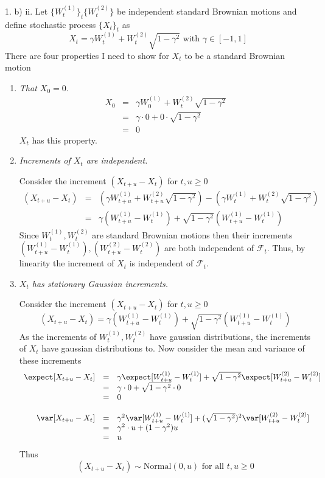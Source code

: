 \documentclass[11pt,a4paper]{article}
\begin{document}
\begin{answer}{1. b) ii.}
  Let $\{W_t^{(1)}\}_t\{W_t^{(2)}\}$ be independent standard Brownian motions and define stochastic process $\{X_t\}_t$ as
  \[ X_t=\gamma W_t^{(1)}+W_t^{(2)}\sqrt{1-\gamma^2}\text{ with }\gamma\in[-1,1] \]
  There are four properties I need to show for $X_t$ to be a standard Brownian motion
  \begin{enumerate}
    \item \textit{That $X_0=0$.}
    \[\begin{array}{rcl}
      X_0&=&\gamma W_0^{(1)}+W_t^{(2)}\sqrt{1-\gamma^2}\\
      &=&\gamma\cdot0+0\cdot\sqrt{1-\gamma^2}\\
      &=&0
    \end{array}\]
    $X_t$ has this property.

    \item \textit{Increments of $X_t$ are independent.}
    \par Consider the increment $(X_{t+u}-X_t)$ for $t,u\geq0$
    \[\begin{array}{rcl}
      (X_{t+u}-X_t)&=&\left(\gamma W_{t+u}^{(1)}+W_{t+u}^{(2)}\sqrt{1-\gamma^2}\right)-\left(\gamma W_{t}^{(1)}+W_{t}^{(2)}\sqrt{1-\gamma^2}\right)\\
      &=&\gamma(W_{t+u}^{(1)}-W_t^{(1)})+\sqrt{1-\gamma^2}(W_{t+u}^{(1)}-W_t^{(1)})
    \end{array}\]
    Since $W_t^{(1)},W_t^{(2)}$ are standard Brownian motions then their increments $(W_{t+u}^{(1)}-W_t^{(1)}),(W_{t+u}^{(2)}-W_t^{(2)})$ are both independent of $\mathcal{F}_t$. Thus, by linearity the increment of $X_t$ is independent of $\mathcal{F}_t$.

    \item \textit{$X_t$ has stationary Gaussian increments.}
    \par Consider the increment $(X_{t+u}-X_t)$ for $t,u\geq0$
    \[ (X_{t+u}-X_t)=\gamma(W_{t+u}^{(1)}-W_t^{(1)})+\sqrt{1-\gamma^2}(W_{t+u}^{(1)}-W_t^{(1)}) \]
    As the increments of $W_t^{(1)},W_t^{(2)}$ have gaussian distributions, the increments of $X_t$ have gaussian distributions to. Now consider the mean and variance of these increments
    \[\begin{array}{rcl}
      \expect[X_{t+u}-X_t]&=&\gamma\expect[W_{t+u}^{(1)}-W_t^{(1)}]+\sqrt{1-\gamma^2}\expect[W_{t+u}^{(2)}-W_t^{(2)}]\\
      &=&\gamma\cdot0+\sqrt{1-\gamma^2}\cdot0\\
      &=&0\\\\
      \var[X_{t+u}-X_t]&=&\gamma^2\var[W_{t+u}^{(1)}-W_t^{(1)}]+(\sqrt{1-\gamma^2})^2\var[W_{t+u}^{(2)}-W_t^{(2)}]\\
      &=&\gamma^2\cdot u+(1-\gamma^2)u\\
      &=&u
    \end{array}\]
    Thus
    \[ (X_{t+u}-X_t)\sim\text{Normal}(0,u)\text{ for all }t,u\geq0 \]


\end{enumerate}
\end{answer}
\end{document}

